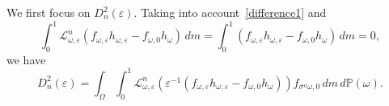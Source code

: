 \documentclass[12pt,reqno,a4paper]{article}
\begin{document}
We first focus on $D_n^2(\varepsilon)$. Taking into account~\eqref{difference1} and
\[
\int_0^1 \mathcal L_{\omega, \varepsilon}^n (f_{\omega, \varepsilon}h_{\omega, \varepsilon}-f_{\omega, 0}h_\omega)\, dm=\int_0^1 (f_{\omega, \varepsilon}h_{\omega, \varepsilon}-f_{\omega, 0}h_\omega)\, dm=0,
\]
we have
\[
D_n^2(\varepsilon)=\int_\Omega \int_0^1 \mathcal L_{\omega, \varepsilon}^n(\varepsilon^{-1}(f_{\omega, \varepsilon}h_{\omega, \varepsilon}-f_{\omega, 0}h_\omega)) f_{\sigma^n \omega, 0}\, dm\, d\mathbb P(\omega).
\]
\end{document}
